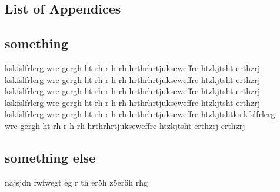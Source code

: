 \newpage \begin{appendices} %
\appendixtocon %
\renewcommand*\appendixpagename{\Large Appendices}  %
\appendixpage %

\subsection*{List of Appendices}


\begin{subappendices}

\renewcommand{\setthesubsection}{\arabic{subsection}:}%


\subsection{something}
kskfslfrlerg wre gergh  ht rh r h rh   hrthrhrtjukseweffre htzkjtsht erthzrj
kskfslfrlerg wre gergh  ht rh r h rh   hrthrhrtjukseweffre htzkjtsht erthzrj
kskfslfrlerg wre gergh  ht rh r h rh   hrthrhrtjukseweffre htzkjtsht erthzrj
kskfslfrlerg wre gergh  ht rh r h rh   hrthrhrtjukseweffre htzkjtsht erthzrj
kskfslfrlerg wre gergh  ht rh r h rh   hrthrhrtjukseweffre htzkjtshtks
kfslfrlerg\\
wre gergh  ht rh r h rh   hrthrhrtjukseweffre htzkjtsht erthzrj erthzrj

\subsection{something else}
najsjdn fwfwegt eg r th er5h z5er6h  rhg 

\end{subappendices}
\end{appendices}


